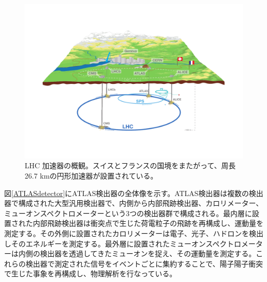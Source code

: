 \begin{figure} 
\centering
\includegraphics[width=16cm]{fig/Intro/LHCoverview.pdf}
\caption[LHC 加速器の概観]{LHC 加速器の概観\cite{cern_general_photo}。スイスとフランスの国境をまたがって、周長26.7 kmの円形加速器が設置されている。}
\label{LHCoverview}
\end{figure}

図\ref{ATLASdetector}にATLAS検出器の全体像を示す。ATLAS検出器は複数の検出器で構成された大型汎用検出器で、内側から内部飛跡検出器、カロリメーター、ミューオンスペクトロメーターという3つの検出器群で構成される。最内層に設置された内部飛跡検出器は衝突点で生じた荷電粒子の飛跡を再構成し、運動量を測定する。その外側に設置されたカロリメーターは電子、光子、ハドロンを検出しそのエネルギーを測定する。最外層に設置されたミューオンスペクトロメーターは内側の検出器を透過してきたミューオンを捉え、その運動量を測定する。これらの検出器で測定された信号をイベントごとに集約することで、陽子陽子衝突で生じた事象を再構成し、物理解析を行なっている。

